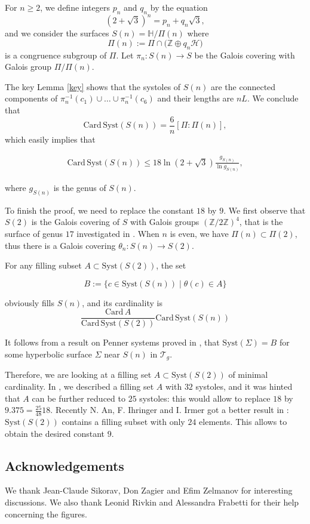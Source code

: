 \documentclass[10pt,a4paper]{amsart}
\newcommand{\HP}{\mathbb{H}}
\newcommand{\Z}{\mathbb{Z}}
\newcommand{\Card}{\mathrm{Card\,}}
\newcommand{\Syst}{{\mathrm {Syst}}}
\newcommand{\cH}{\mathcal{H}}
\newcommand{\cT}{\mathcal{T}}
\begin{document}
For $n\geq 2$, we define  integers $p_n$ and $q_n$ by the equation
$$(2+\sqrt{3})^n=p_n+q_n\sqrt{3},$$
\noindent and we consider the  surfaces 
$S(n)=\HP/\Pi(n)$ where 
$$\Pi(n):=\Pi\cap \big(\Z\oplus q_n\cH)$$
\noindent is a congruence subgroup of $\Pi$. Let $\pi_n: S(n)\to S$ be the 
Galois covering  with Galois group $\Pi/\Pi(n)$.

The key Lemma \ref{key} shows that the systoles of $S(n)$  are the connected components
of $\pi_n^{-1}(c_1)\cup\ldots\cup \pi_n^{-1}(c_6)$ and their lengths are
$nL$. We conclude that
$$\Card \Syst(S(n))=\frac{6}{n}[\Pi:\Pi(n)],$$
\noindent which easily implies that 

\begin{align}
\Card \Syst(S(n))\leq 18\ln(2+\sqrt{3}) \frac{g_{S(n)}}{\ln g_{S(n)}}, \label{inequation18}
\end{align}

\noindent where $g_{S(n)}$ is the genus of $S(n)$.

To finish the proof, we need to replace the constant $18$ by $9$.
We first observe that $S(2)$ is the  Galois covering
of $S$ with Galois groups $(\Z/2\Z)^4$, that is the surface of genus $17$ investigated in \cite{Mathieu}. When $n$ is even,
we have $\Pi(n)\subset\Pi(2)$, thus there is a Galois covering $\theta_n: S(n)\to S(2)$. 

 
For any filling subset $A\subset\Syst(S(2))$, the set 

$$B:=\{c\in \Syst(S(n))\mid \theta(c)\in A\}$$
 
\noindent obviously fills $S(n)$, and its cardinality is 
$$\frac{\Card A}{\Card \Syst(S(2))} \Card \Syst(S(n))$$ 

\noindent It follows from a result on Penner systems
proved in \cite{Mathieu},   that  $\Syst(\Sigma)=B$
for some   hyperbolic surface 
$\Sigma$ near $S(n)$ in $\cT_g$. 

Therefore, we are looking at a filling set $A\subset \Syst(S(2))$ 
of minimal cardinality. In \cite{Mathieu}, we described
a filling set $A$ with $32$ systoles, and it was
hinted that $A$ can be further reduced to $25$ systoles:
this would  allow to replace $18$ by
$9.375=\frac{25}{48} 18$.
Recently  N. An, F. Ihringer and I. Irmer
got a better result  in  \cite{AII}:   $\Syst(S(2))$ contains 
a filling subset with only $24$ elements. This allows to  obtain the desired constant $9$.

\subsection*{Acknowledgements}
We thank Jean-Claude Sikorav, Don Zagier and Efim Zelmanov for interesting discussions.  We also thank Leonid Rivkin and Alessandra Frabetti
for their help concerning the figures.
\end{document}
